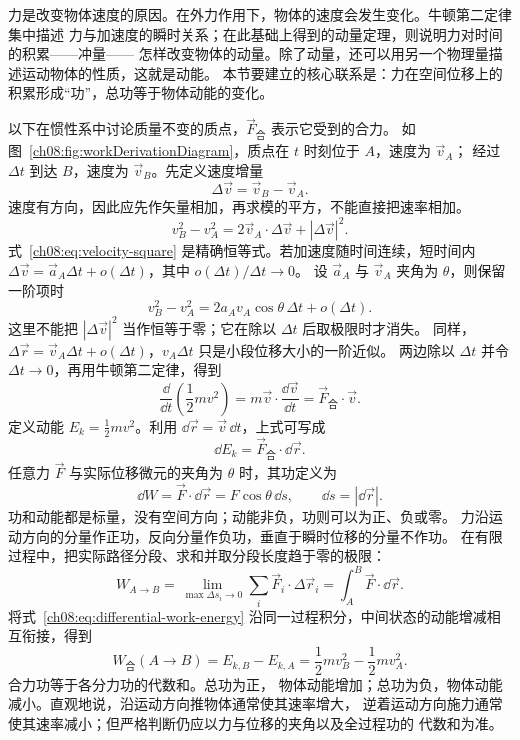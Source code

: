 力是改变物体速度的原因。在外力作用下，物体的速度会发生变化。牛顿第二定律集中描述
力与加速度的瞬时关系；在此基础上得到的动量定理，则说明力对时间的积累——冲量——
怎样改变物体的动量。除了动量，还可以用另一个物理量描述运动物体的性质，这就是动能。
本节要建立的核心联系是：力在空间位移上的积累形成“功”，总功等于物体动能的变化。

以下在惯性系中讨论质量不变的质点，$\vec F_{\text{合}}$ 表示它受到的合力。
如图~\ref{ch08:fig:workDerivationDiagram}，质点在 $t$ 时刻位于 $A$，速度为 $\vec v_A$；
经过 $\Delta t$ 到达 $B$，速度为 $\vec v_B$。先定义速度增量
\[
\Delta\vec v=\vec v_B-\vec v_A.
\]
速度有方向，因此应先作矢量相加，再求模的平方，不能直接把速率相加。
\workDerivationDiagram
\begin{equation}
 v_B^2-v_A^2=2\vec v_A\cdot\Delta\vec v+|\Delta\vec v|^2.
 \label{ch08:eq:velocity-square}
\end{equation}
式~\eqref{ch08:eq:velocity-square} 是精确恒等式。若加速度随时间连续，短时间内
$\Delta\vec v=\vec a_A\Delta t+o(\Delta t)$，其中 $o(\Delta t)/\Delta t\to0$。
设 $\vec a_A$ 与 $\vec v_A$ 夹角为 $\theta$，则保留一阶项时
\begin{equation}
 v_B^2-v_A^2=2a_Av_A\cos\theta\,\Delta t+o(\Delta t).
\end{equation}
这里不能把 $|\Delta\vec v|^2$ 当作恒等于零；它在除以 $\Delta t$ 后取极限时才消失。
同样，$\Delta\vec r=\vec v_A\Delta t+o(\Delta t)$，$v_A\Delta t$ 只是小段位移大小的一阶近似。
两边除以 $\Delta t$ 并令 $\Delta t\to0$，再用牛顿第二定律，得到
\begin{equation}
 \frac{\dd}{\dd t}\left(\frac12mv^2\right)
 =m\vec v\cdot\frac{\dd\vec v}{\dd t}
 =\vec F_{\text{合}}\cdot\vec v.
 \label{ch08:eq:kinetic-rate}
\end{equation}
定义动能 $E_k=\tfrac12mv^2$。利用 $\dd\vec r=\vec v\,\dd t$，上式可写成
\begin{equation}
 \dd E_k=\vec F_{\text{合}}\cdot\dd\vec r.
 \label{ch08:eq:differential-work-energy}
\end{equation}
任意力 $\vec F$ 与实际位移微元的夹角为 $\theta$ 时，其功定义为
\begin{equation}
 \dd W=\vec F\cdot\dd\vec r=F\cos\theta\,\dd s,
 \qquad \dd s=|\dd\vec r|.
 \label{ch08:eq:work-element}
\end{equation}
功和动能都是标量，没有空间方向；动能非负，功则可以为正、负或零。
力沿运动方向的分量作正功，反向分量作负功，垂直于瞬时位移的分量不作功。
在有限过程中，把实际路径分段、求和并取分段长度趋于零的极限：
\begin{equation}
 W_{A\to B}=\lim_{\max\Delta s_i\to0}\sum_i\vec F_i\cdot\Delta\vec r_i
 =\int_A^B\vec F\cdot\dd\vec r.
 \label{ch08:eq:work-integral}
\end{equation}
将式~\eqref{ch08:eq:differential-work-energy} 沿同一过程积分，中间状态的动能增减相互衔接，得到
\begin{equation}
 W_{\text{合}}(A\to B)=E_{k,B}-E_{k,A}
 =\frac12mv_B^2-\frac12mv_A^2.
 \label{ch08:eq:work-energy}
\end{equation}
合力功等于各分力功的代数和。总功为正，
物体动能增加；总功为负，物体动能减小。直观地说，沿运动方向推物体通常使其速率增大，
逆着运动方向施力通常使其速率减小；但严格判断仍应以力与位移的夹角以及全过程功的
代数和为准。


